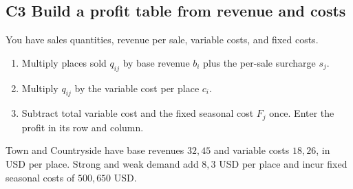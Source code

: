 \clearpage
\enlargethispage{12pt}
\subsection{C3 \textemdash{} Build a profit table from revenue and costs}\label{crit:3}
\Cue You have sales quantities, revenue per sale, variable costs, and fixed costs.
\begin{enumerate}
  \item Multiply places sold \(q_{ij}\) by base revenue \(b_i\) plus the per-sale surcharge \(s_j\).
  \item Multiply \(q_{ij}\) by the variable cost per place \(c_i\).
  \item Subtract total variable cost and the fixed seasonal cost \(F_j\) once. Enter the profit in its row and column.
\end{enumerate}
Town and Countryside have base revenues \(32,45\) and variable costs \(18,26\), in USD per place.
Strong and weak demand add \(8,3\) USD per place and incur fixed seasonal costs of \(500,650\) USD.

